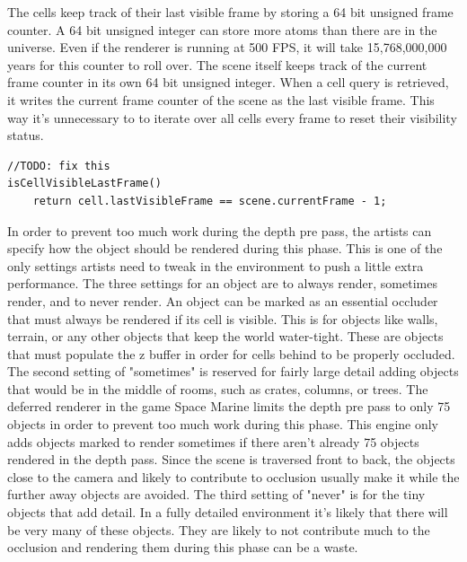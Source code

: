 \documentclass[12pt]{ucthesis}
\begin{document}
The cells keep track of their last visible frame by storing a 64 bit unsigned frame counter.
A 64 bit unsigned integer can store more atoms than there are in the universe.
Even if the renderer is running at 500 FPS, it will take 15,768,000,000 years for this counter to roll over.
The scene itself keeps track of the current frame counter in its own 64 bit unsigned integer.
When a cell query is retrieved, it writes the current frame counter of the scene as the last visible frame.
This way it's unnecessary to to iterate over all cells every frame to reset their visibility status.

\begin{lstlisting}
//TODO: fix this
isCellVisibleLastFrame()
	return cell.lastVisibleFrame == scene.currentFrame - 1;
\end{lstlisting}

In order to prevent too much work during the depth pre pass, the artists can specify how the object should be rendered during this phase.
This is one of the only settings artists need to tweak in the environment to push a little extra performance.
The three settings for an object are to always render, sometimes render, and to never render.
An object can be marked as an essential occluder that must always be rendered if its cell is visible.
This is for objects like walls, terrain, or any other objects that keep the world water-tight.
These are objects that must populate the z buffer in order for cells behind to be properly occluded.
The second setting of "sometimes" is reserved for fairly large detail adding objects that would be in the middle of rooms, such as crates, columns, or trees.
The deferred renderer in the game Space Marine limits the depth pre pass to only 75 objects in order to prevent too much work during this phase. %
This engine only adds objects marked to render sometimes if there aren't already 75 objects rendered in the depth pass.
Since the scene is traversed front to back, the objects close to the camera and likely to contribute to occlusion usually make it while the further away objects are avoided.
The third setting of "never" is for the tiny objects that add detail.
In a fully detailed environment it's likely that there will be very many of these objects.
They are likely to not contribute much to the occlusion and rendering them during this phase can be a waste.
\end{document}
